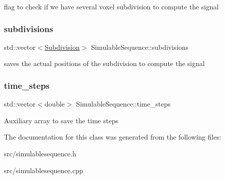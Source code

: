 flag to check if we have several voxel subdivision to compute the signal \mbox{\label{class_simulable_sequence_a77c721d4650578fdc3f44adfa91c030e}} 
\subsubsection{\texorpdfstring{subdivisions}{subdivisions}}
{\footnotesize\ttfamily std\+::vector$<$\hyperlink{class_subdivision}{Subdivision}$>$ Simulable\+Sequence\+::subdivisions}

saves the actual positions of the subdivision to compute the signal \mbox{\label{class_simulable_sequence_a7e7e1a0de6045046061ffccaba4fa5ee}} 
\subsubsection{\texorpdfstring{time\+\_\+steps}{time\_steps}}
{\footnotesize\ttfamily std\+::vector$<$double$>$ Simulable\+Sequence\+::time\+\_\+steps}

Auxiliary array to save the time steps 

The documentation for this class was generated from the following files\+:\begin{DoxyCompactItemize}
\item 
src/simulablesequence.\+h\item 
src/simulablesequence.\+cpp\end{DoxyCompactItemize}
